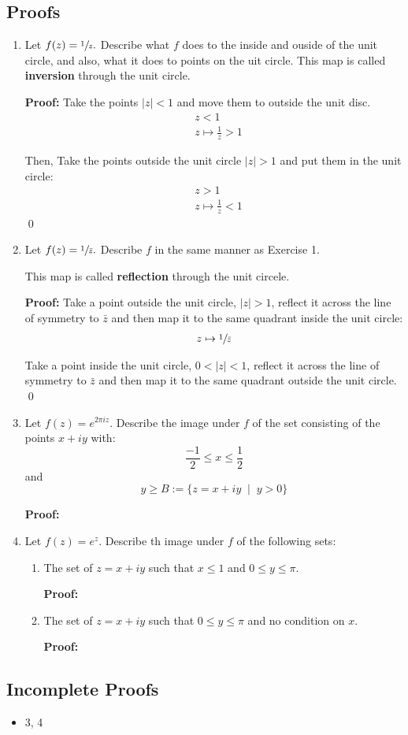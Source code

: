 \subsection{Proofs}
\begin{enumerate}
	\item Let $f(z) = \sfrac{1}{z}.$ Describe what $f$ does to the inside and ouside of the unit circle, 
	and also, what it does to points on the uit circle. This map is called \textbf{inversion} through the unit circle.
	
	\textbf{Proof:}
	Take the points $|z| < 1$ and move them to outside the unit disc.
	\begin{align*}
		&z < 1 \\
		&z \mapsto \frac{1}{z} > 1
	\end{align*}

	Then, Take the points outside the unit circle $|z| > 1$ and put them in the unit circle:
	\begin{align*}
		&z > 1 \\
		&z \mapsto \frac{1}{z} < 1
	\end{align*}
	\qed


	\item Let $f(z) = \sfrac{1}{\bar{z}}.$ Describe $f$ in the same manner as Exercise 1. 

	This map is called \textbf{reflection} through the unit circele.
	
	\textbf{Proof:}
	Take a point outside the unit circle, $|z| > 1$, reflect it across the line of symmetry to $\bar{z}$ and 
	then map it to the same quadrant inside the unit circle:
	\begin{align*}
		z \mapsto \sfrac{1}{\bar{z}} \\
	\end{align*}

	Take a point inside the unit circle, $0 < |z| < 1$, reflect it across the line of symmetry to $\bar{z}$ and 
	then map it to the same quadrant outside the unit circle. 
	\qed


	\item Let $f(z) = e^{2\pi iz}.$ Describe the image under $f$ of the set consisting of the points $x + iy$ with:
	\[ \frac{-1}{2} \leq x \leq \frac{1}{2} \]
	and
	\[ y \geq B := \{ z = x + iy \;\;|\;\; y > 0 \} \]

	\textbf{Proof:}

	\item Let $f(z) = e^z.$ Describe th image under $f$ of the following sets:
	
	\begin{enumerate}
		\item The set of $z = x + iy$ such that $x \leq 1$ and $0 \leq y \leq \pi.$
		
		\textbf{Proof:}

		\item The set of $z = x + iy$ such that $0 \leq y \leq \pi$ and no condition on $x.$
		
		\textbf{Proof:}

	\end{enumerate}
	
\end{enumerate}

\subsection{Incomplete Proofs}
\begin{itemize}
	\item 3, 4
\end{itemize}
\newpage